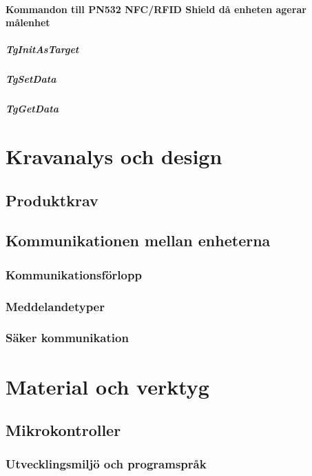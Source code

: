 \documentclass[11pt]{article}
\begin{document}
\paragraph{Kommandon till PN532 NFC/RFID Shield då enheten agerar målenhet}

\subparagraph{TgInitAsTarget}

\subparagraph{TgSetData}

\subparagraph{TgGetData}

\section{Kravanalys och design}

\subsection{Produktkrav}

\subsection{Kommunikationen mellan enheterna}

\subsubsection{Kommunikationsförlopp}

\subsubsection{Meddelandetyper}

\subsubsection{Säker kommunikation}

\section{Material och verktyg}

\subsection{Mikrokontroller}

\subsubsection{Utvecklingsmiljö och programspråk}
\end{document}
